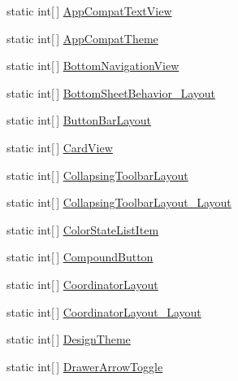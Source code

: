 \begin{CompactItemize}
\item 
static int\mbox{[}$\,$\mbox{]} \hyperlink{class__2doo_1_1_droid_1_1_resource_1_1_styleable_07313cf9d807eda2d72f9d5340beff5b}{AppCompatTextView}
\item 
static int\mbox{[}$\,$\mbox{]} \hyperlink{class__2doo_1_1_droid_1_1_resource_1_1_styleable_d1d72bbd3073c241726df451c223e8c2}{AppCompatTheme}
\item 
static int\mbox{[}$\,$\mbox{]} \hyperlink{class__2doo_1_1_droid_1_1_resource_1_1_styleable_c823a05c50082ac4eecb406f1475cb77}{BottomNavigationView}
\item 
static int\mbox{[}$\,$\mbox{]} \hyperlink{class__2doo_1_1_droid_1_1_resource_1_1_styleable_98a1921d87968286168d4b79dbe3bbff}{BottomSheetBehavior\_\-Layout}
\item 
static int\mbox{[}$\,$\mbox{]} \hyperlink{class__2doo_1_1_droid_1_1_resource_1_1_styleable_4cb8a5493be2ae20e7cdee7100589ddc}{ButtonBarLayout}
\item 
static int\mbox{[}$\,$\mbox{]} \hyperlink{class__2doo_1_1_droid_1_1_resource_1_1_styleable_794081996344323986f0b6b50748cbd4}{CardView}
\item 
static int\mbox{[}$\,$\mbox{]} \hyperlink{class__2doo_1_1_droid_1_1_resource_1_1_styleable_45ef6748945778df1bf1410ee377a17b}{CollapsingToolbarLayout}
\item 
static int\mbox{[}$\,$\mbox{]} \hyperlink{class__2doo_1_1_droid_1_1_resource_1_1_styleable_9d185543ed27f0c4c157f5da7a1fee11}{CollapsingToolbarLayout\_\-Layout}
\item 
static int\mbox{[}$\,$\mbox{]} \hyperlink{class__2doo_1_1_droid_1_1_resource_1_1_styleable_e3653c6424db84304cb77dff35a11f71}{ColorStateListItem}
\item 
static int\mbox{[}$\,$\mbox{]} \hyperlink{class__2doo_1_1_droid_1_1_resource_1_1_styleable_61dd3fd9e969a4bd18b5745feade560e}{CompoundButton}
\item 
static int\mbox{[}$\,$\mbox{]} \hyperlink{class__2doo_1_1_droid_1_1_resource_1_1_styleable_c2f74a4f9f042334a16f8e8a16d4e5c0}{CoordinatorLayout}
\item 
static int\mbox{[}$\,$\mbox{]} \hyperlink{class__2doo_1_1_droid_1_1_resource_1_1_styleable_10e12b29dd07eaa51c47d24e41aac3e9}{CoordinatorLayout\_\-Layout}
\item 
static int\mbox{[}$\,$\mbox{]} \hyperlink{class__2doo_1_1_droid_1_1_resource_1_1_styleable_b385e4c20b94cc5bfe8c8f009543c06d}{DesignTheme}
\item 
static int\mbox{[}$\,$\mbox{]} \hyperlink{class__2doo_1_1_droid_1_1_resource_1_1_styleable_ef152e174d19b04aaad8243b3cc0a7db}{DrawerArrowToggle}

\end{CompactItemize}
